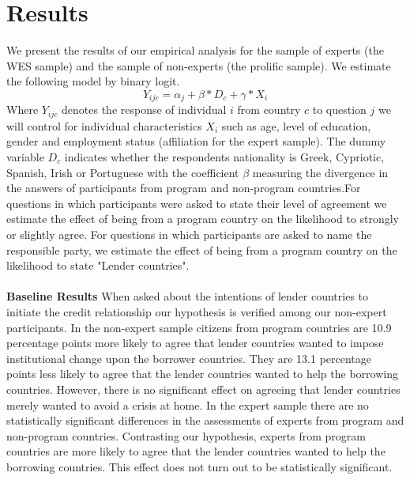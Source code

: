 \clearpage
\section{Results}
We present the results of our empirical analysis for the sample of experts (the WES sample) and the sample of non-experts (the prolific sample).  We estimate the following model by binary logit. 
\begin{equation*}
    Y_{ijc}= \alpha_{j}+ \beta *D_{c} + \gamma*X_{i}
\end{equation*}
Where $Y_{ijc}$ denotes the response of individual $i$ from country $c$ to question $j$ we will control for individual characteristics $X_{i}$ such as age, level of education, gender and employment status (affiliation for the expert sample). The dummy variable $D_{c}$ indicates whether the respondents nationality is Greek, Cypriotic, Spanish, Irish or Portuguese with the coefficient $\beta$ measuring the divergence in the answers of participants from program and non-program countries.For questions in which participants were asked to state their level of agreement we estimate the effect of being from a program country on the likelihood to strongly or slightly agree. For questions in which participants are asked to name the responsible party, we estimate the effect of being from a program country on the likelihood to state "Lender countries". \\ \\
\textbf{Baseline Results} 
When asked about the intentions of lender countries to initiate the credit relationship our hypothesis is verified among our non-expert participants.
 In the non-expert sample citizens from program countries are 10.9 percentage points more likely to agree that lender countries wanted to impose institutional change upon the borrower countries. They are 13.1 percentage points less likely to agree that the lender countries wanted to help the borrowing countries. However, there is no significant effect on agreeing that lender countries merely wanted to avoid a crisis at home. In the expert sample there are no statistically significant differences in the assessments of experts from program and non-program countries. Contrasting our hypothesis,  experts from program countries are more likely to agree that the lender countries wanted to help the borrowing countries. This effect does not turn out to be statistically significant.  \\ 
